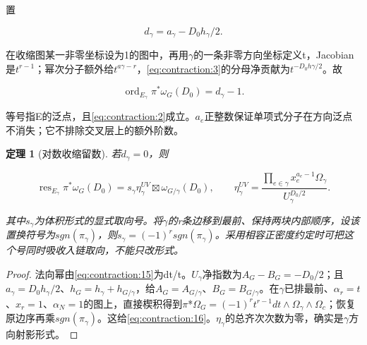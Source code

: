 \documentclass[11pt,a4paper,oneside]{ctexrep}
\theoremstyle{cnplain}
\newtheorem{theorem}{定理}[chapter]
\theoremstyle{definition}
\theoremstyle{remark}
\begin{document}
置

\begin{equation}
d_\gamma=a_\gamma-D_0h_\gamma/2.        \label{eq:contraction:14}
\end{equation}

在收缩图某一非零坐标设为1的图中，再用\(\gamma \)的一条非零方向坐标定义t，Jacobian是\(t^{r- 1}\)；幂次分子额外给\(t^{a\gamma - r}\)，\eqref{eq:contraction:3}的分母净贡献为\(t^{- D_0h\gamma /2}\)。故

\begin{equation}
\operatorname{ord}_{E_\gamma}\pi^*\omega_G(D_0)
                                  =d_\gamma-1.                 \label{eq:contraction:15}
\end{equation}

等号指E的泛点，且\eqref{eq:contraction:2}成立。\(a_e\)正整数保证单项式分子在方向泛点不消失；它不排除交叉层上的额外阶数。

\begin{theorem}[对数收缩留数]

\label{thm:contraction:4.1} 若\(d_\gamma =0\)，则

\begin{equation}
\operatorname{res}_{E_\gamma}\pi^*\omega_G(D_0)
       =s_\gamma\eta_\gamma^{UV}\boxtimes\omega_{G/\gamma}(D_0),\qquad
 \eta_\gamma^{UV}=\frac{\prod_{e\in\gamma}x_e^{a_e-1}\Omega_\gamma}
                                      {U_\gamma^{D_0/2}}.        \label{eq:contraction:16}
\end{equation}

其中\(s_\gamma \)为体积形式的显式取向号。将\(\gamma \)的r条边移到最前、保持两块内部顺序，设该置换符号为\(sgn(\pi _\gamma )\)，则\(s_\gamma =(- 1)^r sgn(\pi _\gamma )\)。采用相容正密度约定时可把这个号同时吸收入链取向，不能只改形式。

\end{theorem}

\begin{proof}

法向幂由\eqref{eq:contraction:15}为dt/t。\(U_\gamma \)净指数为\(A_G- B_G=- D_0/2\)；且\(a_\gamma =D_0h_\gamma /2\)、\(h_G=h_\gamma +h_{G/\gamma }\)，给\(A_G=A_{G/\gamma }\)、\(B_G=B_{G/\gamma }\)。在\(\gamma \)已排最前、\(\alpha _r=t\)、\(x_r=1\)、\(\alpha _N=1\)的图上，直接楔积得到\(\pi \)*\(\Omega _G=(- 1)^r t^{r- 1}dt\wedge \Omega _\gamma \wedge \Omega _c\)；恢复原边序再乘\(sgn(\pi _\gamma )\)。这给\eqref{eq:contraction:16}。\(\eta _\gamma \)的总齐次次数为零，确实是\(\gamma \)方向射影形式。

\end{proof}
\end{document}

